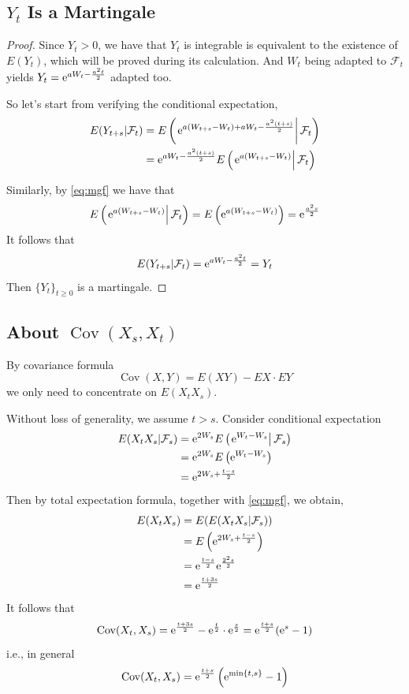 \documentclass{homework}
\DeclareMathOperator{\Cov}{Cov}
\begin{document}
    \subsection{$Y_t$ Is a Martingale}
    \begin{proof}
        Since $Y_t>0$, we have that $Y_t$ is integrable is equivalent
        to the existence of $E(Y_t)$, which will be proved during
        its calculation. And $W_t$ being adapted to $\mathcal F_t$ yields
        $Y_t=\mathrm e^{aW_t-\frac{a^2t}{2}}$ adapted too.

        So let's start from verifying the conditional expectation,
        \[\begin{aligned}
            E(Y_{t+s}|\mathcal F_t)
            &=E\left(\left.\mathrm e^{a(W_{t+s}-W_t)+aW_t-\frac{a^2(t+s)}{2}}\right|\mathcal F_t\right)\\
            &=\mathrm e^{aW_t-\frac{a^2(t+s)}{2}}E\left(\left.\mathrm e^{a(W_{t+s}-W_t)}\right|\mathcal F_t\right)
        \end{aligned}\]

        Similarly, by \cref{eq:mgf} we have that
        \[E\left(\left.\mathrm e^{a(W_{t+s}-W_t)}\right|\mathcal F_t\right)
        =E\left(\mathrm e^{a(W_{t+s}-W_t)}\right)
        =\mathrm e^{\frac{a^2s}{2}}\]
        It follows that
        \[E(Y_{t+s}|\mathcal F_t)=\mathrm e^{aW_t-\frac{a^2t}{2}}=Y_t\]
        Then $\{Y_t\}_{t\geq 0}$ is a martingale.
    \end{proof}

    \subsection{About $\Cov(X_s,X_t)$}
    By covariance formula
    \[\Cov(X,Y)=E(XY)-EX\cdot EY\]
    we only need to concentrate on $E(X_tX_s)$.

    Without loss of generality, we assume $t>s$.
    Consider conditional expectation
    \[\begin{aligned}
        E(X_tX_s|\mathcal F_s)&=\mathrm e^{2W_s}E\left(\left.\mathrm e^{W_t-W_s}\right|\mathcal F_s\right)\\
        &=\mathrm e^{2W_s}E\left(\mathrm e^{W_t-W_s}\right)\\
        &=\mathrm e^{2W_s+\frac{t-s}{2}}
    \end{aligned}\]
    Then by total expectation formula, together with
    \cref{eq:mgf}, we obtain,
    \[\begin{aligned}
        E(X_tX_s)&=E(E(X_tX_s|\mathcal F_s))\\
                 &=E\left(\mathrm e^{2W_s+\frac{t-s}{2}}\right)\\
                 &=\mathrm e^{\frac{t-s}{2}}\mathrm e^{\frac{2^2s}{2}}\\
                 &=\mathrm e^{\frac{t+3s}{2}}
    \end{aligned}\]
    It follows that
    \[\Cov(X_t,X_s)=\e^{\frac{t+3s}{2}}
    -\e^{\frac{t}{2}}\cdot\e^{\frac{s}{2}}
    =\e^{\frac{t+s}{2}}(\e^s-1)\]
    i.e., in general
    \[\Cov(X_t,X_s)=\e^{\frac{t+s}{2}}\left(\e^{\min\{t,s\}}-1\right)\]
\end{document}

